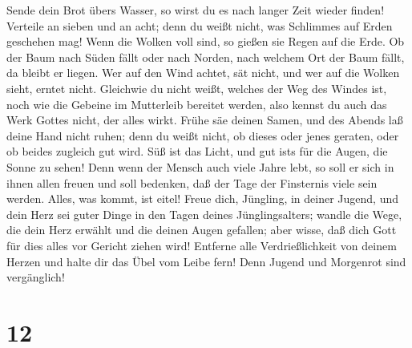  Sende dein Brot übers Wasser, so wirst du es nach langer
Zeit wieder finden!  Verteile an sieben und an acht; denn
du weißt nicht, was Schlimmes auf Erden geschehen mag! 
Wenn die Wolken voll sind, so gießen sie Regen auf die Erde. Ob der Baum
nach Süden fällt oder nach Norden, nach welchem Ort der Baum fällt, da
bleibt er liegen.  Wer auf den Wind achtet, sät nicht, und
wer auf die Wolken sieht, erntet nicht.  Gleichwie du
nicht weißt, welches der Weg des Windes ist, noch wie die Gebeine im
Mutterleib bereitet werden, also kennst du auch das Werk Gottes nicht,
der alles wirkt.  Frühe säe deinen Samen, und des Abends
laß deine Hand nicht ruhen; denn du weißt nicht, ob dieses oder jenes
geraten, oder ob beides zugleich gut wird.  Süß ist das
Licht, und gut ist\textquotesingle s für die Augen, die Sonne zu sehen!
 Denn wenn der Mensch auch viele Jahre lebt, so soll er
sich in ihnen allen freuen und soll bedenken, daß der Tage der
Finsternis viele sein werden. Alles, was kommt, ist eitel!
 Freue dich, Jüngling, in deiner Jugend, und dein Herz sei
guter Dinge in den Tagen deines Jünglingsalters; wandle die Wege, die
dein Herz erwählt und die deinen Augen gefallen; aber wisse, daß dich
Gott für dies alles vor Gericht ziehen wird!  Entferne
alle Verdrießlichkeit von deinem Herzen und halte dir das Übel vom Leibe
fern! Denn Jugend und Morgenrot sind vergänglich!

\hypertarget{section-11}{%
\section{12}\label{section-11}}

